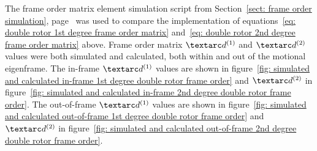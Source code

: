 
The frame order matrix element simulation script from Section~\ref{sect: frame order simulation}, page~\pageref{sect: frame order simulation} was used to compare the implementation of equations~\ref{eq: double rotor 1st degree frame order matrix} and~\ref{eq: double rotor 2nd degree frame order matrix} above.
Frame order matrix $\FOone$ and $\FOtwo$ values were both simulated and calculated, both within and out of the motional eigenframe.
The in-frame $\FOone$ values are shown in figure~\ref{fig: simulated and calculated in-frame 1st degree double rotor frame order} and $\FOtwo$ in figure~\ref{fig: simulated and calculated in-frame 2nd degree double rotor frame order}.
The out-of-frame $\FOone$ values are shown in figure~\ref{fig: simulated and calculated out-of-frame 1st degree double rotor frame order} and $\FOtwo$ in figure~\ref{fig: simulated and calculated out-of-frame 2nd degree double rotor frame order}.
